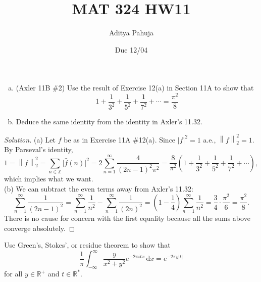 \documentclass[10pt]{article}
\title{MAT 324 HW11}
\author{\large Aditya Pahuja}
\date{\large Due 12/04}
\newcommand{\dd}{\,\mathrm{d}}
\providecommand{\RR}{\mathbb R}
\providecommand{\ZZ}{\mathbb Z}
\providecommand{\ii}{\item}
\newcommand{\what}{\widehat}
\newenvironment{soln}{\begin{proof}[Solution]}{\end{proof}}
\providecommand{\abs}[1]{\left\lvert #1\right\rvert}
\providecommand{\smabs}[1]{\lvert #1\rvert}
\providecommand{\norm}[1]{\left\| #1\right\|}
\begin{document}
\maketitle

\begin{problem}
    \begin{enumerate}[(a)]
        \ii (Axler 11B \#2)
	Use the result of Exercise 12(a) in Section 11A to show that
	\begin{equation*}
	    1 + \frac 1{3^2} + \frac 1{5^2} + \frac 1{7^2} + \cdots = \frac{\pi^2}8
	\end{equation*}
	\ii Deduce the same identity from the identity in Axler's 11.32.
    \end{enumerate}
\end{problem}

\begin{soln}
    (a) Let $f$ be as in Exercise 11A \#12(a).
    Since $\abs{f}^2 = 1$ a.e., $\norm{f}_2^2 = 1$.
    By Parseval's identity,
    \begin{equation*}
	1 = \norm{f}_2^2 = \sum_{n\in\ZZ}\smabs{\what f(n)}^2
	= 2\sum_{n=1}^\infty \frac{4}{(2n-1)^2\pi^2}
	= \frac 8{\pi^2}
	\left(1 + \frac 1{3^2} + \frac 1{5^2} + \frac 1{7^2} + \cdots\right),
    \end{equation*}
    which implies what we want.
    \\

    (b) We can subtract the even terms away from Axler's 11.32:
    \begin{equation*}
	\sum_{n=1}^\infty \frac 1{(2n-1)^2}
	= \sum_{n=1}^\infty \frac 1{n^2}
	- \sum_{n=1}^\infty \frac 1{(2n)^2}
	= \left(1 - \frac 14\right)\sum_{n=1}^\infty \frac1{n^2}
	= \frac 34\cdot\frac{\pi^2}6 = \boxed{\frac{\pi^2}8}.
    \end{equation*}
    There is no cause for concern with the first equality
    because all the sums above converge absolutely.
\end{soln}

\begin{problem}
    Use Green's, Stokes', or residue theorem to show that
    \begin{equation*}
	\frac 1\pi\int_{-\infty}^\infty \frac{y}{x^2 + y^2}e^{-2\pi itx}\dd x
	= e^{-2\pi y\abs t}
    \end{equation*}
    for all $y\in\RR^+$ and $t\in\RR^*$.
\end{problem}
\end{document}
